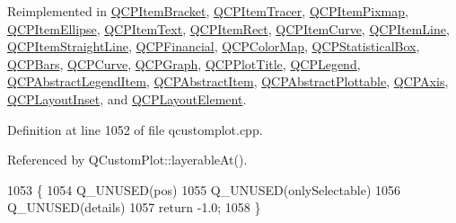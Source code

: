 Reimplemented in \hyperlink{class_q_c_p_item_bracket_aa6933caff1d42c54bcebc769ef88c798}{Q\+C\+P\+Item\+Bracket}, \hyperlink{class_q_c_p_item_tracer_ae71f3728421c83c188c117279ca050fd}{Q\+C\+P\+Item\+Tracer}, \hyperlink{class_q_c_p_item_pixmap_a9f8436aa141fa0fb504191c882c2f4d9}{Q\+C\+P\+Item\+Pixmap}, \hyperlink{class_q_c_p_item_ellipse_acd7e5f9528630b2ab5987e2a5782eb7c}{Q\+C\+P\+Item\+Ellipse}, \hyperlink{class_q_c_p_item_text_a285b95bb6634c2e4f7768abb7a8bc69c}{Q\+C\+P\+Item\+Text}, \hyperlink{class_q_c_p_item_rect_af13b0797079b40b73d1c7286b76f18ac}{Q\+C\+P\+Item\+Rect}, \hyperlink{class_q_c_p_item_curve_a741375c11667b5f9c95b2683f93ee514}{Q\+C\+P\+Item\+Curve}, \hyperlink{class_q_c_p_item_line_a7541e5d9378ca121d07b0df3b24f7178}{Q\+C\+P\+Item\+Line}, \hyperlink{class_q_c_p_item_straight_line_a64cc3796f58ce856012732603edb2f1c}{Q\+C\+P\+Item\+Straight\+Line}, \hyperlink{class_q_c_p_financial_adf6cff00a55f775487d375fe4df5e95b}{Q\+C\+P\+Financial}, \hyperlink{class_q_c_p_color_map_a4088dc7bcbe9bba605c84a912ba660ff}{Q\+C\+P\+Color\+Map}, \hyperlink{class_q_c_p_statistical_box_a7d3ac843dc48a085740fdfc4319a89cc}{Q\+C\+P\+Statistical\+Box}, \hyperlink{class_q_c_p_bars_a0d37a9feb1d0baf73ce6e809db214445}{Q\+C\+P\+Bars}, \hyperlink{class_q_c_p_curve_a5af9949e725704811bbc81ecd5970b8e}{Q\+C\+P\+Curve}, \hyperlink{class_q_c_p_graph_abc9ff375aabcf2d21cca33d6baf85772}{Q\+C\+P\+Graph}, \hyperlink{class_q_c_p_plot_title_a5b7ae716be9134a48f4e378feb0e6699}{Q\+C\+P\+Plot\+Title}, \hyperlink{class_q_c_p_legend_aa3892801051bc7b985e003576df844db}{Q\+C\+P\+Legend}, \hyperlink{class_q_c_p_abstract_legend_item_ad0480d5cad34627a294a2921caa4a62f}{Q\+C\+P\+Abstract\+Legend\+Item}, \hyperlink{class_q_c_p_abstract_item_a96d522d10ffc0413b9a366c6f7f0476b}{Q\+C\+P\+Abstract\+Item}, \hyperlink{class_q_c_p_abstract_plottable_a38efe9641d972992a3d44204bc80ec1d}{Q\+C\+P\+Abstract\+Plottable}, \hyperlink{class_q_c_p_axis_a2877a6230920c118be65c6113089f467}{Q\+C\+P\+Axis}, \hyperlink{class_q_c_p_layout_inset_ab5a2f2b88c05e369fd7da9583d17aa3a}{Q\+C\+P\+Layout\+Inset}, and \hyperlink{class_q_c_p_layout_element_a9fcf5d0ea19f2c23b2b528bce2c6f095}{Q\+C\+P\+Layout\+Element}.



Definition at line 1052 of file qcustomplot.\+cpp.



Referenced by Q\+Custom\+Plot\+::layerable\+At().


\begin{DoxyCode}
1053 \{
1054   Q\_UNUSED(pos)
1055   Q\_UNUSED(onlySelectable)
1056   Q\_UNUSED(details)
1057   return -1.0;
1058 \}
\end{DoxyCode}



